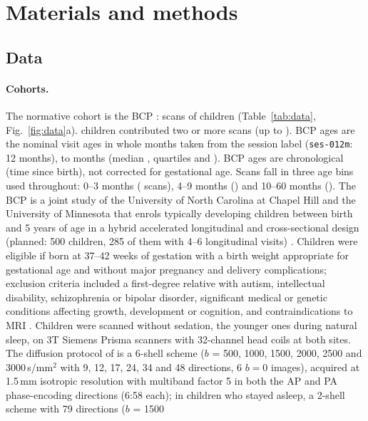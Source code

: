 \documentclass[11pt]{article}
\begin{document}
\section{Materials and methods}

\subsection{Data}\label{sec:data}

\paragraph{Cohorts.} The normative cohort is the BCP \citep{howell2019bcp}: \bcpscans{} scans of \bcpsubjects{}
children (Table~\ref{tab:data}, Fig.~\ref{fig:data}a). \bcpsubjTwoPlus{} children contributed two or more scans (up to
\bcpsessmax{}). BCP ages are the nominal visit ages in whole months taken from the session label (\texttt{ses-012m}:
12 months), \bcpagemin{} to \bcpagemax{} months (median \bcpagemedian{}, quartiles \bcpageQOne{} and \bcpageQThree{}).
BCP ages are chronological (time since birth), not corrected for gestational age. Scans fall in three
age bins used throughout: 0--3 months (\bcpbinA{} scans), 4--9 months (\bcpbinB{}) and 10--60 months (\bcpbinC{}). The
BCP is a joint study of the University of North Carolina at Chapel Hill and the University of Minnesota that enrols
typically developing children between birth and 5 years of age in a hybrid accelerated longitudinal and cross-sectional
design (planned: 500 children, 285 of them with 4--6 longitudinal visits) \citep{howell2019bcp}. Children were eligible
if born at 37--42 weeks of gestation with a birth weight appropriate for gestational age and without major pregnancy and
delivery complications; exclusion criteria included a first-degree relative with autism, intellectual disability,
schizophrenia or bipolar disorder, significant medical or genetic conditions affecting growth, development or
cognition, and contraindications to MRI \citep{howell2019bcp}. Children were scanned without sedation, the younger ones
during natural sleep, on 3T Siemens Prisma scanners with 32-channel head coils at both sites. The diffusion protocol of
\citet{howell2019bcp} is a 6-shell scheme ($b$ = 500, 1000, 1500, 2000, 2500 and 3000\,s/mm$^2$ with 9, 12, 17, 24, 34
and 48 directions, 6 $b=0$ images), acquired at 1.5\,mm isotropic resolution with multiband factor 5 in both the AP and
PA phase-encoding directions (6:58 each); in children who stayed asleep, a 2-shell scheme with 79 directions ($b$ = 1500
\end{document}
